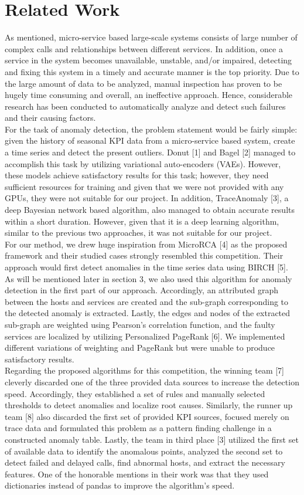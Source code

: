 \documentclass[12pt]{article}
\begin{document}
\section{Related Work}
As mentioned, micro-service based large-scale systems consists of large number of complex calls and relationships between different services. In addition, once a service in the system becomes unavailable, unstable, and/or impaired, detecting and fixing this system in a timely and accurate manner is the top priority. Due to the large amount of data to be analyzed, manual inspection has proven to be hugely time consuming and overall, an ineffective approach. Hence, considerable research has been conducted to automatically analyze and detect such failures and their causing factors.\\
For the task of anomaly detection, the problem statement would be fairly simple: given the history of seasonal KPI data from a micro-service based system, create a time series and detect the present outliers. Donut [1] and Bagel [2] managed to accomplish this task by utilizing variational auto-encoders (VAEs). However, these models achieve satisfactory results for this task; however, they need sufficient resources for training and given that we were not provided with any GPUs, they were not suitable for our project. In addition, TraceAnomaly [3], a deep Bayesian network based algorithm, also managed to obtain accurate results within a short duration. However, given that it is a deep learning algorithm, similar to the previous two approaches, it was not suitable for our project. \\
For our method, we drew huge inspiration from MicroRCA [4] as the proposed framework and their studied cases strongly resembled this competition. Their approach would first detect anomalies in the time series data using BIRCH [5]. As will be mentioned later in section 3, we also used this algorithm for anomaly detection in the first part of our approach. Accordingly, an attributed graph between the hosts and services are created and the sub-graph corresponding to the detected anomaly is extracted. Lastly, the edges and nodes of the extracted sub-graph are weighted using Pearson's correlation function, and the faulty services are localized by utilizing Personalized PageRank [6]. We implemented different variations of weighting and PageRank but were unable to produce satisfactory results. \\
Regarding the proposed algorithms for this competition, the winning team [7] cleverly discarded one of the three provided data sources to increase the detection speed. Accordingly, they established a set of rules and manually selected thresholds to detect anomalies and localize root causes. Similarly, the runner up team [8] also discarded the first set of provided KPI sources, focused merely on trace data and formulated this problem as a pattern finding challenge in a constructed anomaly table. Lastly, the team in third place [3] utilized the first set of available data to identify the anomalous points, analyzed the second set to detect failed and delayed calls, find abnormal hosts, and extract the necessary features. One of the honorable mentions in their work was that they used dictionaries instead of pandas to improve the algorithm's speed.
\end{document}
